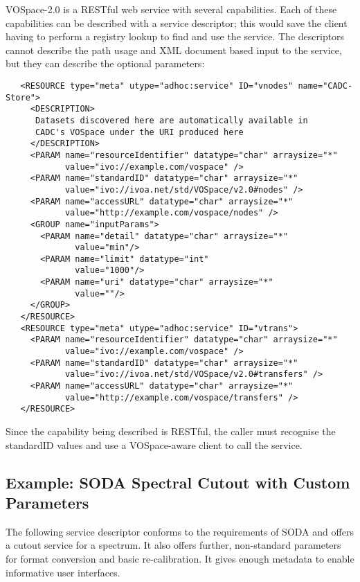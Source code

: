 \documentclass[11pt,a4paper]{ivoa}
\begin{document}
VOSpace-2.0 is a RESTful web service with several capabilities. Each of
these capabilities can be described with a service descriptor; this would
save the client having to perform a registry lookup to find and use the
service. The descriptors cannot describe the path usage and XML document
based input to the service, but they can describe the optional parameters:
\begin{verbatim}
   <RESOURCE type="meta" utype="adhoc:service" ID="vnodes" name="CADC-Store">
     <DESCRIPTION>
      Datasets discovered here are automatically available in
      CADC's VOSpace under the URI produced here
     </DESCRIPTION>
     <PARAM name="resourceIdentifier" datatype="char" arraysize="*"
            value="ivo://example.com/vospace" />
     <PARAM name="standardID" datatype="char" arraysize="*"
            value="ivo://ivoa.net/std/VOSpace/v2.0#nodes" />
     <PARAM name="accessURL" datatype="char" arraysize="*"
            value="http://example.com/vospace/nodes" />
     <GROUP name="inputParams">
       <PARAM name="detail" datatype="char" arraysize="*"
              value="min"/>
       <PARAM name="limit" datatype="int"
              value="1000"/>
       <PARAM name="uri" datatype="char" arraysize="*"
              value=""/>
     </GROUP>
   </RESOURCE>
   <RESOURCE type="meta" utype="adhoc:service" ID="vtrans">
     <PARAM name="resourceIdentifier" datatype="char" arraysize="*"
            value="ivo://example.com/vospace" />
     <PARAM name="standardID" datatype="char" arraysize="*"
            value="ivo://ivoa.net/std/VOSpace/v2.0#transfers" />
     <PARAM name="accessURL" datatype="char" arraysize="*"
            value="http://example.com/vospace/transfers" />
   </RESOURCE>
\end{verbatim}
Since the capability being described is RESTful, the
caller must recognise the standardID values and use a VOSpace-aware
client to call the service.


\subsection{Example: SODA Spectral Cutout with Custom Parameters}

The following service descriptor conforms to the requirements of SODA
\citep{2017ivoa.spec.0517B} and offers a cutout service for a spectrum.
It also offers further, non-standard parameters for format conversion
and basic re-calibration.  It gives enough metadata to enable
informative user interfaces.
\end{document}
